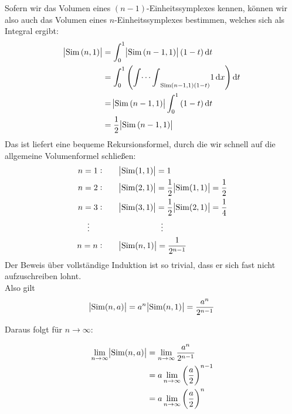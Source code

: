 \documentclass[a4paper,german,12pt,smallheadings]{scrartcl}
\begin{document}
Sofern wir das Volumen eines $(n-1)$-Einheitssymplexes kennen, können wir also auch das Volumen eines $n$-Einheitssymplexes bestimmen, welches sich als Integral ergibt: 
\begin{align*}
  \envert{\operatorname{Sim}\del{n,1}} &= \int_0^1 \envert{\operatorname{Sim}\del{n-1,1}} (1-t) \dif t \\
                                       &= \int_0^1 \del{{\int \dots \int}_{\operatorname{Sim}\del{n-1,1} (1-t)} 1 \dif x} \dif t \\
    &= \envert{\operatorname{Sim}\del{n-1, 1}} \int_0^1 \del{1-t} \dif t \\
    &= \frac{1}{2} \envert{\operatorname{Sim}\del{n-1, 1}}
\end{align*}
Das ist liefert eine bequeme Rekursionsformel, durch die wir schnell auf die allgemeine Volumenformel schließen:
\begin{align*}
  n = 1: \qquad &\envert{\operatorname{Sim}(1,1)} = 1 \\
  n = 2: \qquad &\envert{\operatorname{Sim}(2,1)} = \frac{1}{2} \envert{\operatorname{Sim}(1,1)} = \frac{1}{2} \\
  n = 3: \qquad &\envert{\operatorname{Sim}(3,1)} = \frac{1}{2} \envert{\operatorname{Sim}(2,1)} = \frac{1}{4} \\
  \vdots \qquad \quad \;\; & \qquad \qquad \quad \, \vdots \\
  n = n: \qquad &\envert{\operatorname{Sim}(n,1)} = \frac{1}{2^{n-1}}
\end{align*}
Der Beweis über vollständige Induktion ist so trivial, dass er sich fast nicht aufzuschreiben lohnt.\\
Also gilt
\begin{equation*}
  \envert{\operatorname{Sim}(n,a)} = a^n \envert{\operatorname{Sim}(n,1)} = \frac{a^n}{2^{n-1}}
\end{equation*}

Daraus folgt für $n \to \infty$:

\begin{align*}
  \lim\limits_{n \to \infty} \envert{\operatorname{Sim}(n,a)} &= \lim\limits_{n \to \infty} \frac{a^n}{2^{n-1}} \\
                                                              &= a \lim\limits_{n \to \infty} \del{\frac{a}{2}}^{n-1} \\
                                                              &= a \lim\limits_{n \to \infty} \del{\frac{a}{2}}^{n}
\end{align*}
\end{document}
